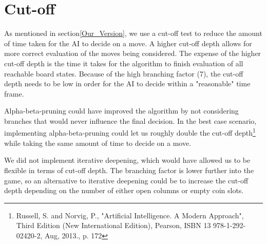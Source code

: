 \section{Cut-off}
\label{Cutoff}
As mentioned in section\ref{Our_Version}, we use a cut-off test to reduce the amount of time taken for the AI to decide on a move. A higher cut-off depth allows for more correct evaluation of the moves being considered. The expense of the higher cut-off depth is the time it takes for the algorithm to finish evaluation of all reachable board states. Because of the high branching factor (7), the cut-off depth needs to be low in order for the AI to decide within a "reasonable" time frame.

Alpha-beta-pruning could have improved the algorithm by not considering branches that would never influence the final decision. In the best case scenario, implementing alpha-beta-pruning could let us roughly double the cut-off depth\footnote{Russell, S. and Norvig, P., "Artificial Intelligence. A Modern Approach", Third Edition (New International Edition), Pearson, ISBN 13 978-1-292-02420-2, Aug, 2013., p. 172} while taking the same amount of time to decide on a move.

We did not implement iterative deepening, which would have allowed us to be flexible in terms of cut-off depth. The branching factor is lower further into the game, so an alternative to iterative deepening could be to increase the cut-off depth depending on the number of either open columns or empty coin slots.
